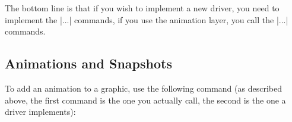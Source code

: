 The bottom line is that if you wish to implement a new driver, you need to
implement the |\pgfsys@anim...| commands, if you use the animation layer, you
call the |\pgfsysanim...| commands.


\subsection{Animations and Snapshots}

To add an animation to a graphic, use the following command (as described
above, the first command is the one you actually call, the second is the one a
driver implements):

\begin{command}{\pgfsysanimate{}}
\end{command}

